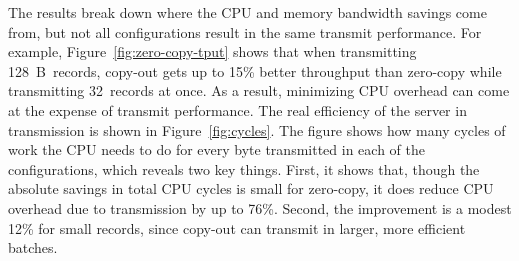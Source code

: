 

The results break down where the CPU and memory bandwidth savings come from,
but not all configurations result in the same transmit performance. For
example, Figure~\ref{fig:zero-copy-tput} shows that when transmitting
128~B~records, copy-out gets up to 15\% better throughput than zero-copy while transmitting
32~records at once. As a result, minimizing CPU overhead can come at the expense of transmit
performance.  The real efficiency of the server in transmission is shown in
Figure~\ref{fig:cycles}. The figure shows how many cycles of work the CPU needs to do
for every byte transmitted in each of the configurations, which reveals two key things.
First, it shows that, though the absolute savings in total CPU cycles is small
for zero-copy, it does reduce CPU overhead due to transmission by up to 76\%.
Second, the improvement is a modest 12\% for small records, since
copy-out can transmit in larger, more efficient batches.

%

%



